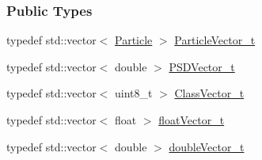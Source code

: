 \subsubsection*{Public Types}
\begin{DoxyCompactItemize}
\item 
typedef std\+::vector$<$ \hyperlink{class_soil_analyzer_1_1_particle}{Particle} $>$ \hyperlink{class_soil_analyzer_1_1_particle_a4e43dab999d36d5a5f809bb4be5ff3a7}{Particle\+Vector\+\_\+t}
\item 
typedef std\+::vector$<$ double $>$ \hyperlink{class_soil_analyzer_1_1_particle_aba1003586622fdf1dbc87c0dabc46f1d}{P\+S\+D\+Vector\+\_\+t}
\item 
typedef std\+::vector$<$ uint8\+\_\+t $>$ \hyperlink{class_soil_analyzer_1_1_particle_ad2038e90ac83a1cbd34a28e8fdefbfdc}{Class\+Vector\+\_\+t}
\item 
typedef std\+::vector$<$ float $>$ \hyperlink{class_soil_analyzer_1_1_particle_a712eef8db3e7bcb96b5fd3fb34f53fcb}{float\+Vector\+\_\+t}
\item 
typedef std\+::vector$<$ double $>$ \hyperlink{class_soil_analyzer_1_1_particle_a4ae1bf667c41c7df60cc933e9e5f82eb}{double\+Vector\+\_\+t}
\end{DoxyCompactItemize}
